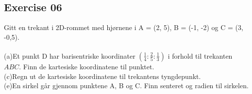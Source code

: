 \documentclass[12pt, a4paper]{article}
\begin{document}
\subsection*{Exercise 06}
Gitt en trekant i 2D-rommet med hjørnene i A = (2, 5),
	B = (-1, -2) og C = (3, -0,5).\\\\
	(a)\quad Et punkt D har barisentriske koordinater $
		\left(\frac{1}{4}:\frac{2}{5}:\frac{1}{3}\right)
	$ i forhold til trekanten $ABC$. Finn de kartesiske 
	koordinatene til punktet.
			\begin{equation}
				\tag*{}
			\end{equation}
	(c)\quad Regn ut de kartesiske koordinatene til trekantens
	tyngdepunkt.
			\begin{equation}
				\tag*{}
			\end{equation}
	(e)\quad En sirkel går gjennom punktene A, B og C.
	Finn senteret og radien til sirkelen.
			\begin{equation}
				\tag*{}
			\end{equation}
\end{document}
